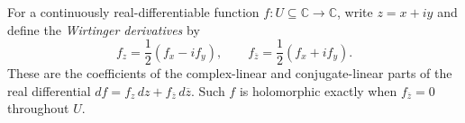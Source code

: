 
For a continuously real-differentiable function $f:U\subseteq\mathbb C\to\mathbb C$, write $z=x+iy$ and define the \emph{Wirtinger derivatives} by
\[
f_z=\frac12(f_x-if_y),\qquad f_{\overline z}=\frac12(f_x+if_y).
\]
These are the coefficients of the complex-linear and conjugate-linear parts of the real differential $df=f_z\,dz+f_{\overline z}\,d\overline z$. Such $f$ is holomorphic exactly when $f_{\overline z}=0$ throughout $U$.
